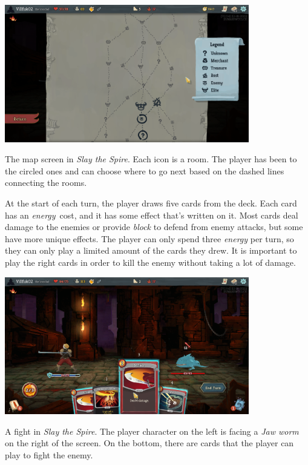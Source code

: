 \begin{center}
    \captionsetup{type=figure}
    \includegraphics[width=0.8\textwidth]{img/Slay-the-Spire-Map.png}
    \caption{The map screen in \emph{Slay the Spire}. Each icon is a room. The player has been to the circled ones and can choose where to go next based on the dashed lines connecting the rooms.}
    \label{fig:sts-map}
\end{center}

At the start of each turn, the player draws five cards from the deck.
Each card has an \emph{energy}~cost, and it has some effect that's written on it.
Most cards deal damage to the enemies or provide \emph{block} to defend from enemy attacks, but some have more unique effects.
The player can only spend three \emph{energy} per turn, so they can only play a limited amount of the cards they drew.
It is important to play the right cards in order to kill the enemy without taking a lot of damage.

\begin{center}
    \captionsetup{type=figure}
    \includegraphics[width=0.8\textwidth]{img/Slay-the-Spire-Fight.png}
    \caption{A fight in \emph{Slay the Spire}. The player character on the left is facing a \emph{Jaw worm} on the right of the screen. On the bottom, there are cards that the player can play to fight the enemy.}
    \label{fig:sts-fight}
\end{center}


